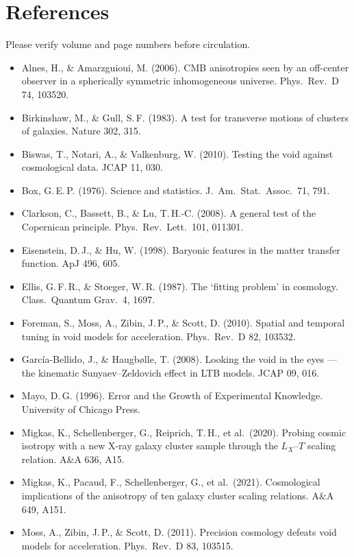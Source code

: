 \documentclass[11pt]{article}
\begin{document}
\section*{References}
\small Please verify volume and page numbers before circulation.
\begin{itemize}\itemsep0pt
\item Alnes, H., \& Amarzguioui, M. (2006). CMB anisotropies seen by an off-center observer in a spherically symmetric inhomogeneous universe. Phys.\ Rev.\ D 74, 103520.
\item Birkinshaw, M., \& Gull, S.\,F. (1983). A test for transverse motions of clusters of galaxies. Nature 302, 315.
\item Biswas, T., Notari, A., \& Valkenburg, W. (2010). Testing the void against cosmological data. JCAP 11, 030.
\item Box, G.\,E.\,P. (1976). Science and statistics. J.\ Am.\ Stat.\ Assoc.\ 71, 791.
\item Clarkson, C., Bassett, B., \& Lu, T.\,H.-C. (2008). A general test of the Copernican principle. Phys.\ Rev.\ Lett.\ 101, 011301.
\item Eisenstein, D.\,J., \& Hu, W. (1998). Baryonic features in the matter transfer function. ApJ 496, 605.
\item Ellis, G.\,F.\,R., \& Stoeger, W.\,R. (1987). The `fitting problem' in cosmology. Class.\ Quantum Grav.\ 4, 1697.
\item Foreman, S., Moss, A., Zibin, J.\,P., \& Scott, D. (2010). Spatial and temporal tuning in void models for acceleration. Phys.\ Rev.\ D 82, 103532.
\item Garc\'ia-Bellido, J., \& Haugb{\o}lle, T. (2008). Looking the void in the eyes --- the kinematic Sunyaev--Zeldovich effect in LTB models. JCAP 09, 016.
\item Mayo, D.\,G. (1996). Error and the Growth of Experimental Knowledge. University of Chicago Press.
\item Migkas, K., Schellenberger, G., Reiprich, T.\,H., et al.\ (2020). Probing cosmic isotropy with a new X-ray galaxy cluster sample through the $L_X$--$T$ scaling relation. A\&A 636, A15.
\item Migkas, K., Pacaud, F., Schellenberger, G., et al.\ (2021). Cosmological implications of the anisotropy of ten galaxy cluster scaling relations. A\&A 649, A151.
\item Moss, A., Zibin, J.\,P., \& Scott, D. (2011). Precision cosmology defeats void models for acceleration. Phys.\ Rev.\ D 83, 103515.

\end{itemize}
\end{document}
